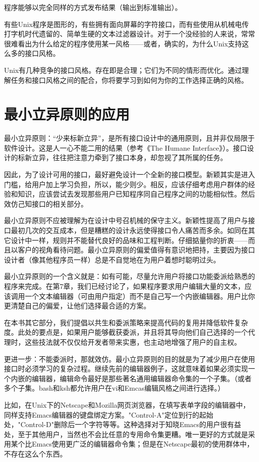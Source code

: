 \documentclass[12pt,oneside]{book}
\begin{document}
程序能够以完全同样的方式发布结果（输出到标准输出）。

有些Unix程序是图形的，有些拥有面向屏幕的字符接口，而有些使用从机械电传打字机时代遗留的、简单生硬的文本过滤器设计。对于一个没经验的人来说，常常很难看出为什么给定的程序使用某一风格——或者，确实的，为什么Unix支持这么多的接口风格。

Unix有几种竞争的接口风格。存在即是合理；它们为不同的情形而优化。通过理解任务和接口风格之间的配合，你将要学习到如何为你的工作选择正确的风格。

\section{最小立异原则的应用}
最小立异原则：“少来标新立异”，是所有接口设计中的通用原则，且并非仅局限于软件设计。这是人一心不能二用的结果（参考《The Humane Interface》\cite{Raskin}）。接口设计的标新立异，往往把注意力牵到了接口本身，却忽视了其所属的任务。

因此，为了设计可用的接口，最好避免设计一个全新的接口模型。新颖其实是进入门槛，给用户加上学习负担，所以，能少则少。相反，应该仔细考虑用户群体的经验和知识，应该尝试去发现那些用户已知程序同自己程序之间的功能相似性。然后效仿己知接口的相关部分。

最小立异原则不应被理解为在设计中号召机械的保守主义。新颖性提高了用户与接口最初几次的交互成本，但是糟糕的设计永远使得接口令人痛苦而多余。如同在其它设计中一样，规则并不能替代良好的品味和工程判断。仔细掂量你的折衷——而且以客户的视角看待问题。最小立异原则的偏爱值得有意识地把持，主要因为接口设计者（像其他程序员一样）总是不自觉地在为用户着想时聪明过头。

最小立异原则的一个含义就是：如有可能，尽量允许用户将接口功能委派给熟悉的程序来完成。在第7章，我们已经讨论了，如果程序要求用户编辑大量的文本，应该调用一个文本编辑器（可由用户指定）而不是自己写一个内嵌编辑器。用户比你更清楚自己的偏爱，让他们选择最合适的方案。

在本书其它部分，我们提倡以共生和委派策略来提高代码的复用并降低软件复杂度。此处的要点是，如果用户能够截获委派，并且将其导向他们自己选择的一个代理时，这些技法就不仅仅给开发者带来实惠，也主动地增强了用户的自主权。

更进一步：不能委派时，那就效仿。最小立异原则的目的就是为了减少用户在使用接口时必须学习的复杂过程。继续先前的编辑器例子，这就意味着如果必须实现一个内嵌的编辑器，编辑命令最好是那些著名通用编辑器命令集的一个子集。（或者多个子集。bash和ksh都允许用户在vi和Emcas编辑风格之间进行选择。）

比如，在Unix下的Netscape和Mozilla网页浏览器，在填写表单字段的编辑器中，同样支持Emacs编辑器的键盘绑定方案。"Control-A"定位到行的起始处，"Control-D"删除后一个字符等等。这种选择对于知晓Emacs的用户很有益处，至于其他用户，当然也不会比任意的专用命令集更糟。唯一更好的方式就是采用某个比Emacs使用更广泛的编辑器命令集；但是在Netscape最初的使用群体中，不存在这么个东西。
\end{document}
